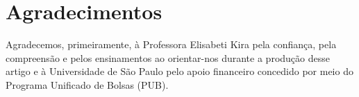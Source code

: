 \documentclass[a4paper,10pt,twocolumn]{article}
\begin{document}
\section{Agradecimentos}

Agradecemos, primeiramente, à Professora Elisabeti Kira pela confiança, pela
compreensão e pelos ensinamentos ao orientar-nos durante a produção desse artigo
e à Universidade de São Paulo pelo apoio financeiro concedido por meio do
Programa Unificado de Bolsas (PUB).

\vspace{0.5cm}


\end{document}
